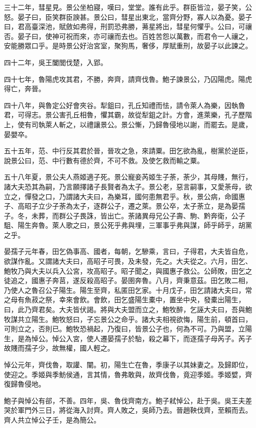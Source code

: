 三十二年，彗星見。景公坐柏寢，嘆曰，堂堂。誰有此乎。群臣皆泣，晏子笑，公怒。晏子曰，臣笑群臣諛甚。景公曰，彗星出東北，當齊分野，寡人以為憂。晏子曰，君高臺深池，賦斂如弗得，刑罰恐弗勝，茀星將出，彗星何懼乎。公曰，可禳否。晏子曰，使神可祝而來，亦可禳而去也。百姓苦怨以萬數，而君令一人禳之，安能勝眾口乎。是時景公好治宮室，聚狗馬，奢侈，厚賦重刑，故晏子以此諫之。

四十二年，吳王闔閭伐楚，入郢。

四十七年，魯陽虎攻其君，不勝，奔齊，請齊伐魯。鮑子諫景公，乃囚陽虎。陽虎得亡，奔晉。

四十八年，與魯定公好會夾谷。犁鉏曰，孔丘知禮而怯，請令萊人為樂，因執魯君，可得志。景公害孔丘相魯，懼其霸，故從犁鉏之計。方會，進萊樂，孔子歷階上，使有司執萊人斬之，以禮讓景公。景公慚，乃歸魯侵地以謝，而罷去。是歲，晏嬰卒。

五十五年，范、中行反其君於晉，晉攻之急，來請粟。田乞欲為亂，樹黨於逆臣，說景公曰，范、中行數有德於齊，不可不救。及使乞救而輸之粟。

五十八年夏，景公夫人燕姬適子死。景公寵妾芮姬生子荼，荼少，其母賤，無行，諸大夫恐其為嗣，乃言願擇諸子長賢者為太子。景公老，惡言嗣事，又愛荼母，欲立之，憚發之口，乃謂諸大夫曰，為樂耳，國何患無君乎。秋，景公病，命國惠子、高昭子立少子荼為太子，逐群公子，遷之萊。景公卒，太子荼立，是為晏孺子。冬，未葬，而群公子畏誅，皆出亡。荼諸異母兄公子壽、駒、黔奔衛，公子駔、陽生奔魯。萊人歌之曰，景公死乎弗與埋，三軍事乎弗與謀，師乎師乎，胡黨之乎。

晏孺子元年春，田乞偽事高、國者，每朝，乞驂乘，言曰，子得君，大夫皆自危，欲謀作亂。又謂諸大夫曰，高昭子可畏，及未發，先之。大夫從之。六月，田乞、鮑牧乃與大夫以兵入公宮，攻高昭子。昭子聞之，與國惠子救公。公師敗，田乞之徒追之，國惠子奔莒，遂反殺高昭子。晏圉奔魯。八月，齊秉意茲。田乞敗二相，乃使人之魯召公子陽生。陽生至齊，私匿田乞家。十月戊子，田乞請諸大夫曰，常之母有魚菽之祭，幸來會飲。會飲，田乞盛陽生橐中，置坐中央，發橐出陽生，曰，此乃齊君矣。大夫皆伏謁。將與大夫盟而立之，鮑牧醉，乞誣大夫曰，吾與鮑牧謀共立陽生。鮑牧怒曰，子忘景公之命乎。諸大夫相視欲悔，陽生前，頓首曰，可則立之，否則已。鮑牧恐禍起，乃復曰，皆景公子也，何為不可。乃與盟，立陽生，是為悼公。悼公入宮，使人遷晏孺子於駘，殺之幕下，而逐孺子母芮子。芮子故賤而孺子少，故無權，國人輕之。

悼公元年，齊伐魯，取讙、闡。初，陽生亡在魯，季康子以其妹妻之。及歸即位，使迎之。季姬與季魴侯通，言其情，魯弗敢與，故齊伐魯，竟迎季姬。季姬嬖，齊復歸魯侵地。

鮑子與悼公有郤，不善。四年，吳、魯伐齊南方。鮑子弒悼公，赴于吳。吳王夫差哭於軍門外三日，將從海入討齊。齊人敗之，吳師乃去。晉趙鞅伐齊，至賴而去。齊人共立悼公子壬，是為簡公。

